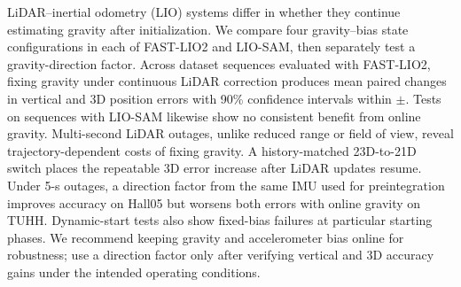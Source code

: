 LiDAR--inertial odometry (LIO) systems differ in whether they continue estimating
gravity after initialization. We compare four gravity--bias state configurations
in each of FAST-LIO2 and LIO-SAM, then separately test a gravity-direction factor.
Across \NumCoreSeq{} dataset sequences evaluated with FAST-LIO2,
fixing gravity under continuous LiDAR correction produces mean paired changes
in vertical and 3D position errors with 90\% confidence intervals within $\pm$\StrictEquivMargin{}.
Tests on \NumLioSamSeq{} sequences with LIO-SAM likewise show no consistent benefit from
online gravity. Multi-second LiDAR outages, unlike reduced range or field of
view, reveal trajectory-dependent costs of fixing gravity. A history-matched
23D-to-21D switch places the repeatable 3D error increase after LiDAR updates
resume. Under 5-s outages, a direction factor from the same IMU used for
preintegration improves accuracy on Hall05 but worsens both errors with online
gravity on TUHH. Dynamic-start tests also show fixed-bias failures at
particular starting phases. We recommend keeping gravity and accelerometer
bias online for robustness; use a direction factor only after verifying
vertical and 3D accuracy gains under the intended operating conditions.
